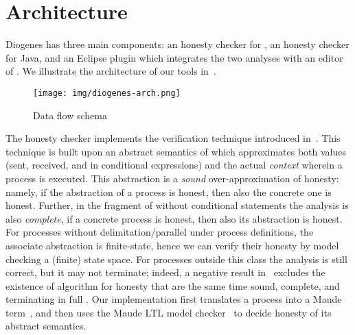 \section{Architecture}

Diogenes has three main components:
an honesty checker for \coco,
an honesty checker for Java,
and an Eclipse plugin which integrates the two analyses
with an editor of \coco.
We illustrate the architecture of our tools in~.

\begin{figure}[t]
    \texttt{[image: img/diogenes-arch.png]}
    \caption{Data flow schema}
    \label{fig:architecture}
\end{figure}

The \coco honesty checker implements the  
verification technique introduced in~\cite{BMSZ15jlamp}.
This technique is built upon an abstract semantics of \coco 
which approximates both values (sent, received, and in conditional expressions) 
and the actual \emph{context} wherein a process is executed.
This abstraction is a \emph{sound} over-approximation of honesty:
namely, if the abstraction of a process is honest,
then also the concrete one is honest.
Further, in the fragment of \coco without conditional statements
the analysis is also \emph{complete},
\ie if a concrete process is honest, then also its abstraction is honest.
For processes without delimitation/parallel under process definitions,
the associate abstraction is finite-state, 
hence we can verify their honesty by model checking a (finite) state space.
For processes outside this class the analysis is still correct, 
but it may not terminate; indeed, a negative result in~\cite{BZ15wsfm}
excludes the existence of algorithm for honesty that are the same time
sound, complete, and terminating in full \coco.
Our implementation 
first translates a \coco process into a Maude term~\cite{Maude01}, 
and then uses the Maude LTL model checker~\cite{Eker02maude}
to decide honesty of its abstract semantics.



